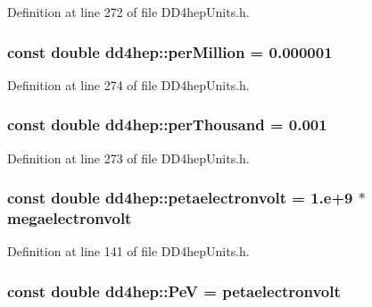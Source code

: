 Definition at line 272 of file DD4hepUnits.h.\hypertarget{namespacedd4hep_a3c86fbb277949a5ee64673266d8f9f93}{
\subsubsection[{perMillion}]{\setlength{\rightskip}{0pt plus 5cm}const double {\bf dd4hep::perMillion} = 0.000001}}
\label{namespacedd4hep_a3c86fbb277949a5ee64673266d8f9f93}


Definition at line 274 of file DD4hepUnits.h.\hypertarget{namespacedd4hep_ab0f604563df4dec531bdb35bd2f97a6f}{
\subsubsection[{perThousand}]{\setlength{\rightskip}{0pt plus 5cm}const double {\bf dd4hep::perThousand} = 0.001}}
\label{namespacedd4hep_ab0f604563df4dec531bdb35bd2f97a6f}


Definition at line 273 of file DD4hepUnits.h.\hypertarget{namespacedd4hep_a096cb423758a909c122182a3eed457d1}{
\subsubsection[{petaelectronvolt}]{\setlength{\rightskip}{0pt plus 5cm}const double {\bf dd4hep::petaelectronvolt} = 1.e+9 $\ast$ {\bf megaelectronvolt}}}
\label{namespacedd4hep_a096cb423758a909c122182a3eed457d1}


Definition at line 141 of file DD4hepUnits.h.\hypertarget{namespacedd4hep_ae90286dc351bfa44df11c5ebf9dbdbe9}{
\subsubsection[{PeV}]{\setlength{\rightskip}{0pt plus 5cm}const double {\bf dd4hep::PeV} = {\bf petaelectronvolt}}}
\label{namespacedd4hep_ae90286dc351bfa44df11c5ebf9dbdbe9}


